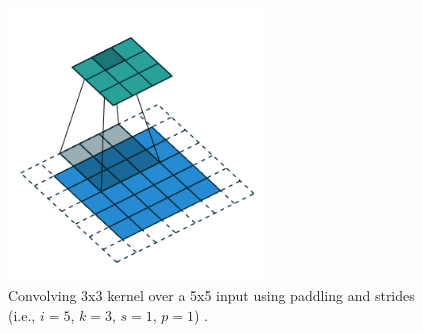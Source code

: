 \begin{figure} [H]
\centering
\includegraphics[width=0.6\textwidth]{figures/Kernel}
\caption{Convolving 3x3 kernel over a 5x5 input using paddling and strides (i.e., $i=5$, $k=3$, $s=1$, $p=1$) \citep{Dumoulin2016}.}
\label{fig:Kernel}  
\end{figure}

